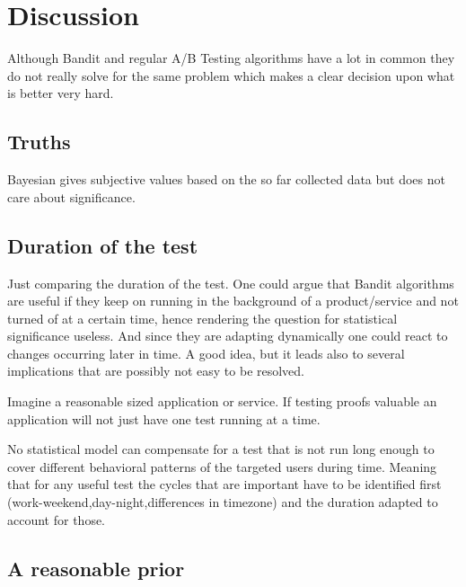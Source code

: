 \documentclass[main.tex]{subfiles}
\begin{document}
\chapter{Discussion}
Although Bandit and regular A/B Testing algorithms have a lot in common they do not really solve for the same problem which makes a clear decision upon what is better very hard.
\section{Truths}
Bayesian gives subjective values based on the so far collected data but does not care about significance.

\section{Duration of the test}
Just comparing the duration of the test. One could argue that Bandit algorithms are useful if they keep on running in the background of a product/service and not turned of at a certain time, hence rendering the question for statistical significance useless. And since they are adapting dynamically one could react to changes occurring later in time. A good idea, but it leads also to several implications that are possibly not easy to be resolved. 

Imagine a reasonable sized application or service. If testing proofs valuable an application will not just have one test running at a time. 

No statistical model can compensate for a test that is not run long enough to cover different behavioral patterns of the targeted users during time. Meaning that for any useful test the cycles that are important have to be identified first (work-weekend,day-night,differences in timezone) and the duration adapted to account for those.

\section{A reasonable prior}
\end{document}
